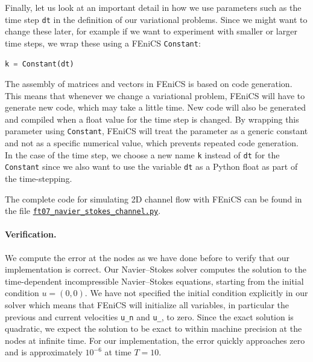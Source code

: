 \documentclass[graybox,envcountchap,sectrefs,final]{svmonodo}
\begin{document}
Finally, let us look at an important detail in how we use parameters
such as the time step \texttt{dt} in the definition of our variational
problems. Since we might want to change these later, for example if we
want to experiment with smaller or larger time steps, we wrap these
using a FEniCS \texttt{Constant}:

\begin{lstlisting}[language=Python,style=graycolor]
k = Constant(dt)
\end{lstlisting}

The assembly of matrices and vectors in FEniCS is based on code
generation. This means that whenever we change a variational problem,
FEniCS will have to generate new code, which may take a little
time. New code will also be generated and compiled when a float value
for the time step is changed. By wrapping this parameter using
\texttt{Constant}, FEniCS will treat the parameter as a generic constant and
not as a specific numerical value, which prevents repeated code
generation. In the case of the time step, we choose a new name \texttt{k}
instead of \texttt{dt} for the \texttt{Constant} since we also want to use the
variable \texttt{dt} as a Python float as part of the time-stepping.

The complete code for simulating 2D channel flow with FEniCS
can be found in the file \href{{https://fenicsproject.org/pub/tutorial/python/vol1/ft07_navier_stokes_channel.py}}{\nolinkurl{ft07_navier_stokes_channel.py}}.






\paragraph{Verification.}

We compute the error at the nodes as we have done before to verify
that our implementation is correct. Our Navier--Stokes solver computes
the solution to the time-dependent incompressible Navier--Stokes
equations, starting from the initial condition $u = (0, 0)$. We have
not specified the initial condition explicitly in our solver which
means that FEniCS will initialize all variables, in particular the
previous and current velocities \Verb!u_n! and \Verb!u_!, to zero. Since the
exact solution is quadratic, we expect the solution to be exact to
within machine precision at the nodes at infinite time. For our
implementation, the error quickly approaches zero and is approximately
$10^{-6}$ at time $T = 10$.
\end{document}
